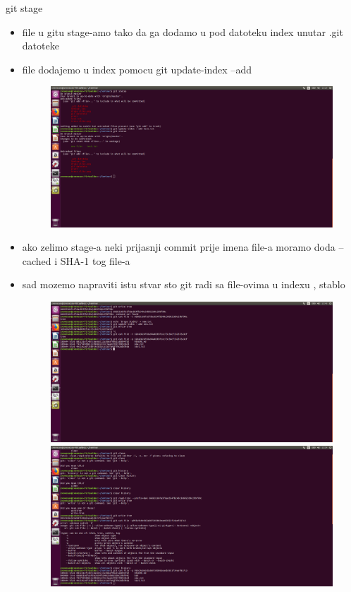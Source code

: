 \documentclass[]{beamer}
\begin{document}
\begin{frame}{git stage}

\begin{itemize}
	\item file u gitu stage-amo tako da ga dodamo u pod datoteku index unutar .git datoteke
	\item file dodajemo u index pomocu git update-index --add
	\begin{figure}
		\centering
	\includegraphics[scale=.48]{./slike/cetvrta_slika.png}
	\end{figure}
	\item ako zelimo stage-a neki prijasnji commit prije imena file-a moramo doda --cached i SHA-1 tog file-a
	\item sad mozemo napraviti istu stvar sto git radi sa file-ovima u indexu , stablo
	\begin{figure}
		\centering
	\includegraphics[scale=.48]{./slike/peta_slika.png}
	\includegraphics[scale=.48]{./slike/sesta_slika.png}
	\end{figure}
		
\end{itemize}


\end{frame}
\end{document}
